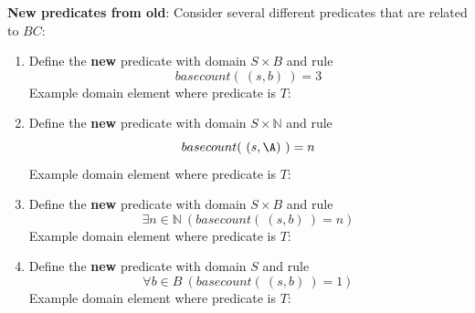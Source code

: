 
{\bf New predicates from old}: Consider several different predicates that are related to $BC$: 
\begin{enumerate}
\item Define the {\bf new} predicate with domain $S \times B$ and rule
\[
basecount(~(s,b)~) = 3
\]
Example domain element where predicate is $T$: \phantom{$(\A\U\A\A, \A)$}\\

\vfill

\item Define the {\bf new} predicate with domain $S \times \mathbb{N}$ and rule
\[
basecount(~(s,\A)~) = n
\]
Example domain element where predicate is $T$: \phantom{$(\A\U\A,2)$}\\

\vfill


\item Define the {\bf new} predicate with domain $S \times B$ and rule
\[
\exists n \in \mathbb{N} ~(basecount(~(s,b)~) = n)
\]
Example domain element where predicate is $T$: \phantom{$(\A\U\A,\A)$}\\

\vfill


\item Define the {\bf new} predicate with domain $S$ and rule
\[
\forall b \in B ~(basecount(~(s,b)~) = 1)
\]
Example domain element where predicate is $T$: \phantom{$\A\C\G\U$}\\

\vfill


\end{enumerate}